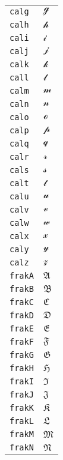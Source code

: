 \begin{longtable}{ll}
\texttt{calg}&${}{\mathcal{g}}{}$\\
\texttt{calh}&${}{\mathcal{h}}{}$\\
\texttt{cali}&${}{\mathcal{i}}{}$\\
\texttt{calj}&${}{\mathcal{j}}{}$\\
\texttt{calk}&${}{\mathcal{k}}{}$\\
\texttt{call}&${}{\mathcal{l}}{}$\\
\texttt{calm}&${}{\mathcal{m}}{}$\\
\texttt{caln}&${}{\mathcal{n}}{}$\\
\texttt{calo}&${}{\mathcal{o}}{}$\\
\texttt{calp}&${}{\mathcal{p}}{}$\\
\texttt{calq}&${}{\mathcal{q}}{}$\\
\texttt{calr}&${}{\mathcal{r}}{}$\\
\texttt{cals}&${}{\mathcal{s}}{}$\\
\texttt{calt}&${}{\mathcal{t}}{}$\\
\texttt{calu}&${}{\mathcal{u}}{}$\\
\texttt{calv}&${}{\mathcal{v}}{}$\\
\texttt{calw}&${}{\mathcal{w}}{}$\\
\texttt{calx}&${}{\mathcal{x}}{}$\\
\texttt{caly}&${}{\mathcal{y}}{}$\\
\texttt{calz}&${}{\mathcal{z}}{}$\\
\texttt{frakA}&${}{\mathfrak{A}} {}$\\
\texttt{frakB}&${}{\mathfrak{B}} {}$\\
\texttt{frakC}&${}{\mathfrak{C}} {}$\\
\texttt{frakD}&${}{\mathfrak{D}} {}$\\
\texttt{frakE}&${}{\mathfrak{E}} {}$\\
\texttt{frakF}&${}{\mathfrak{F}} {}$\\
\texttt{frakG}&${}{\mathfrak{G}} {}$\\
\texttt{frakH}&${}{\mathfrak{H}} {}$\\
\texttt{frakI}&${}{\mathfrak{I}} {}$\\
\texttt{frakJ}&${}{\mathfrak{J}} {}$\\
\texttt{frakK}&${}{\mathfrak{K}} {}$\\
\texttt{frakL}&${}{\mathfrak{L}} {}$\\
\texttt{frakM}&${}{\mathfrak{M}} {}$\\
\texttt{frakN}&${}{\mathfrak{N}} {}$\\

\end{longtable}
